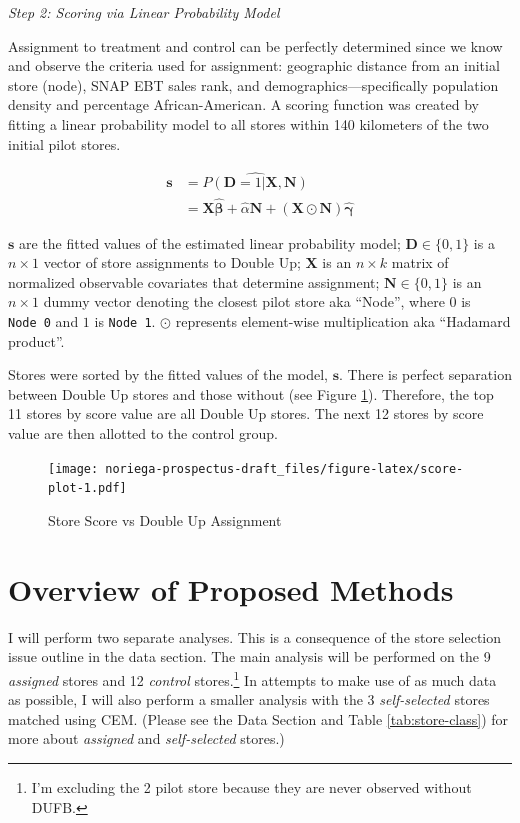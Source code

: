 \documentclass[12pt,letterpaperpaper,]{book}
\begin{document}
\emph{Step 2: Scoring via Linear Probability Model}

Assignment to treatment and control can be perfectly determined since we
know and observe the criteria used for assignment: geographic distance
from an initial store (node), SNAP EBT sales rank, and
demographics---specifically population density and percentage
African-American. A scoring function was created by fitting a linear
probability model to all stores within 140 kilometers of the two initial
pilot stores.

\[
\begin{aligned}
  \bm{s}  &= \widehat{P(\mathbf{D} = 1 | \bm{X}, \bm{N})} \\
          &= \mathbf{X} \bm{\hat \beta} + \hat \alpha \mathbf{N} + \left (\mathbf{X} \odot \mathbf{N} \right ) \bm{\hat \gamma}
\end{aligned}
\]

\(\bm{s}\) are the fitted values of the estimated linear probability
model; \(\mathbf{D} \in \{0,1 \}\) is a \(n \times 1\) vector of store
assignments to Double Up; \(\mathbf{X}\) is an \(n \times k\) matrix of
normalized observable covariates that determine assignment;
\(\mathbf{N} \in \{0, 1 \}\) is an \(n \times 1\) dummy vector denoting
the closest pilot store aka ``Node'', where \(0\) is \texttt{Node\ 0}
and \(1\) is \texttt{Node\ 1}. \(\odot\) represents element-wise
multiplication aka ``Hadamard product''.

Stores were sorted by the fitted values of the model, \(\bm{s}\). There
is perfect separation between Double Up stores and those without (see
Figure \ref{fig:score-plot}). Therefore, the top 11 stores by score
value are all Double Up stores. The next 12 stores by score value are
then allotted to the control group.

\begin{figure}
\centering
\texttt{[image: noriega-prospectus-draft\_files/figure-latex/score-plot-1.pdf]}
\caption{\label{fig:score-plot}Store Score vs Double Up Assignment}
\end{figure}

\section*{Overview of Proposed Methods}\label{methods-1}

I will perform two separate analyses. This is a consequence of the store
selection issue outline in the data section. The main analysis will be
performed on the 9 \emph{assigned} stores and 12 \emph{control}
stores.\footnote{I'm excluding the 2 pilot store because they are never
  observed without DUFB.} In attempts to make use of as much data as
possible, I will also perform a smaller analysis with the 3
\emph{self-selected} stores matched using CEM. (Please see the
\protect\hypertarget{data-1}{}{Data} Section and Table
\ref{tab:store-class}) for more about \emph{assigned} and
\emph{self-selected} stores.)
\end{document}
